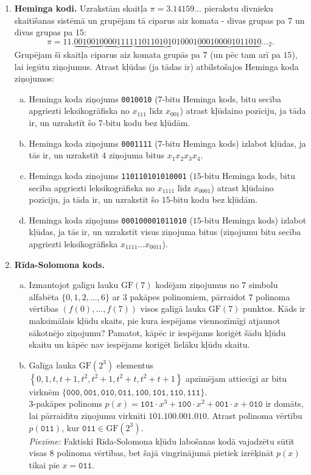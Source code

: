 \documentclass[11pt]{article}
\begin{document}
\begin{enumerate}
\item {\bf Heminga kodi.} 
Uzrakstām skaitļa $\pi = 3.14159\ldots$ pierakstu divnieku skaitīšanas sistēmā un 
grupējam tā ciparus aiz komata - divas grupas pa $7$ un divas grupas pa $15$:
$$\pi = 11.\underbrace{0010010}\underbrace{0001111}\underbrace{110110101010001}\underbrace{000100001011010}\ldots_2.$$
Grupējam šī skaitļa ciparus aiz komata grupās pa $7$ (un pēc tam arī pa
$15$), lai iegūtu ziņojumus. Atrast kļūdas (ja tādas ir) atbilstošajos Heminga koda ziņojumos:
\begin{enumerate}[(a)]
\item Heminga koda ziņojums {\tt 0010010} ($7$-bitu Heminga kods, bitu secība apgriezti leksikogrāfiska
\textendash{} no $x_{111}$ līdz $x_{001}$) \textendash{} atrast kļūdaino pozīciju, ja tāda ir, un uzrakstīt šo $7$-bitu kodu bez kļūdām.
\item Heminga koda ziņojums {\tt 0001111} ($7$-bitu Heminga kods) \textendash{} izlabot kļūdas, ja tās ir, un uzrakstīt $4$ ziņojuma bitus $x_1x_2x_3x_4$. 
\item Heminga koda ziņojums {\tt 110110101010001} ($15$-bitu Heminga kods, bitu secība apgriezti leksikogrāfiska 
\textendash{} no $x_{1111}$ līdz $x_{0001}$) \textendash{} atrast kļūdaino pozīciju, ja tāda ir, un uzrakstīt šo $15$-bitu kodu bez kļūdām.
\item Heminga koda ziņojums {\tt 000100001011010} ($15$-bitu Heminga kods) \textendash{} 
izlabot kļūdas, ja tās ir, un uzrakstīt visus ziņojuma bitus (ziņojumu bitu secība apgriezti leksikogrāfiska $x_{1111}\ldots{}x_{0011}$).
\end{enumerate}

\item {\bf Rīda-Solomona kods.} 
\begin{enumerate}[(a)]
\item Izmantojot galīgu lauku $\text{GF}(7)$ kodējam ziņojumus no 
$7$ simbolu alfabēta $\{ 0,1,2,\ldots,6 \}$ ar $3$ pakāpes polinomiem, 
pārraidot $7$ polinoma vērtības $(f(0),\ldots,f(7))$ visos
galīgā lauka $\text{GF}(7)$ punktos. 
Kāds ir maksimālais kļūdu skaits, pie kura iespējams 
viennozīmīgi atjaunot sākotnējo ziņojumu?
Pamatot, kāpēc ir iespējams koriģēt šādu kļūdu skaitu un kāpēc nav
iespējams koriģēt lielāku kļūdu skaitu.
\item Galīga lauka $\text{GF}(2^3)$ elementus $\left\{ 0,1,t,t+1,t^2,t^2+1,t^2+t,t^2+t+1 \right\}$
apzīmējam attiecīgi ar bitu virknēm $\{\mathtt{000},\mathtt{001},\mathtt{010},\mathtt{011},
\mathtt{100},\mathtt{101},\mathtt{110},\mathtt{111}\}$.\\
$3$-pakāpes polinoms $p(x) = \mathtt{101}\cdot{}x^3 + \mathtt{100}\cdot{}x^2 + \mathtt{001}\cdot{}x + \mathtt{010}$
ir domāts, lai pārraidītu ziņojumu virknīti $\mathtt{101.100.001.010}$. 
Atrast polinoma vērtību $p(\mathtt{011})$, kur $\mathtt{011}\in\text{GF}(2^3)$.\\
{\em Piezīme:} Faktiski Rīda-Solomona kļūdu labošanas kodā vajadzētu sūtīt 
visas $8$ polinoma vērtības, bet šajā vingrinājumā pietiek izrēķināt $p(x)$ tikai pie $x=\mathtt{011}$. 
\end{enumerate}


\end{enumerate}
\end{document}
